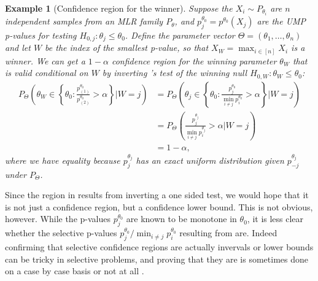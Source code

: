 \documentclass{article}
\newtheorem{example}{Example}
\begin{document}
\begin{appendix}
\begin{example}[Confidence region for the winner] 
    \label{exm:confidence_region}
    Suppose the $X_i \sim P_{\theta_i}$ are $n$ independent samples from an MLR family $P_{\theta}$, and $p^{\theta_0}_j =  p^{\theta_0}(X_j)$ are the UMP p-values for testing $H_{0, j} : \theta_j \leq \theta_0$. Define the parameter vector $\Theta = (\theta_1, \dots, \theta_n)$ and let $W$ be the index of the smallest p-value, so that $X_W = \max_{i \in [n]} X_i$ is a winner. We can get a $1-\alpha$ confidence region for the winning parameter $\theta_W$ that is valid conditional on $W$ by inverting 's test of the winning null $H_{0, W} : \theta_W \leq \theta_0$:
    \begin{align*}
        \label{eq:winner_cr}
        P_{\Theta}\left( \theta_W \in \left\{ \theta_0 : \frac{p^{\theta_0}_{(1)}}{p^{\theta_0}_{(2)}} > \alpha \right\} | W=j \right) &= P_{\Theta}\left( \theta_j \in \left\{ \theta_0 : \frac{p^{\theta_0}_{j}}{ \min_{i \neq j} p^{\theta_0}_i} > \alpha \right\} | W=j \right)\\
                                     &= P_{\Theta}\left(  \frac{p^{\theta_j}_{j}}{ \min_{i \neq j} p^{\theta_j}_i} > \alpha  | W=j \right)\\
                                    &= 1-\alpha,
    \end{align*} 
    where we have equality because $p^{\theta_j}_j$ has an exact uniform distribution given $p^{\theta_j}_{-j}$ under $P_{\Theta}$. 
\end{example}

Since the region in  results from inverting a one sided test, we would hope that it is not just a confidence region, but a confidence lower bound. This is not obvious, however. While the p-values $p^{\theta_0}_j$ are known to be monotone in $\theta_0$, it is less clear whether the selective p-values $p^{\theta_0}_{j}/ \min_{i \neq j} p^{\theta_0}_i$ resulting from  are. Indeed confirming that selective confidence regions are actually invervals or lower bounds can be tricky in selective problems, and proving that they are is sometimes done on a case by case basis \citep{Benjamini, Lee} or not at all \citep{Sengupta}. 


\end{appendix}
\end{document}
